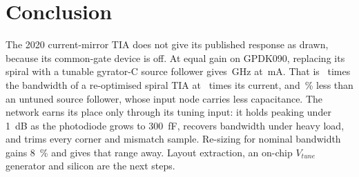 \documentclass[conference]{IEEEtran}
\begin{document}
\section{Conclusion}
The 2020 current-mirror TIA does not give its published response as drawn, because its common-gate device is off. At equal gain on GPDK090, replacing its spiral with a tunable gyrator-C source follower gives \PoneBw\,GHz at \PoneI\,mA. That is \RatioBwPoneBone\ times the bandwidth of a re-optimised spiral TIA at \RatioIPoneBone\ times its current, and \PctBwLoss\,\% less than an untuned source follower, whose input node carries less capacitance. The network earns its place only through its tuning input: it holds peaking under \SI{1}{dB} as the photodiode grows to \SI{300}{fF}, recovers bandwidth under heavy load, and trims every corner and mismatch sample. Re-sizing for nominal bandwidth gains \SI{8}{\percent} and gives that range away. Layout extraction, an on-chip $V_{tune}$ generator and silicon are the next steps.
\end{document}
